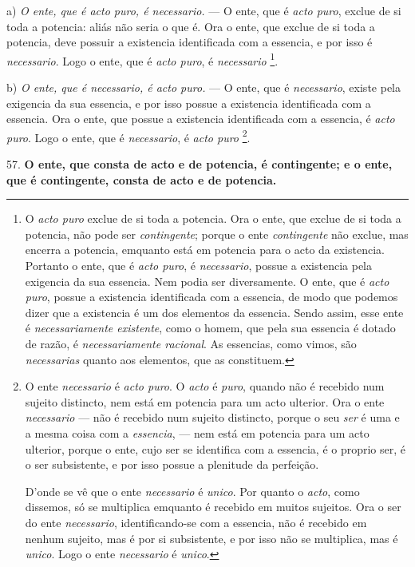 a) \emph{O ente, que é acto puro, é necessario.} --- O ente, que é \emph{acto puro}, exclue de si toda a potencia: aliás não seria o que é. Ora o ente, que exclue de si toda a potencia, deve possuir a existencia identificada com a essencia, e por isso é \emph{necessario}. Logo o ente, que é \emph{acto puro}, é \emph{necessario} \footnote{O \emph{acto puro} exclue de si toda a potencia. Ora o ente, que exclue de si toda a potencia, não pode ser \emph{contingente}; porque o ente \emph{contingente} não exclue, mas encerra a potencia, emquanto está em potencia para o acto da existencia. Portanto o ente, que é \emph{acto puro}, é \emph{necessario}, possue a existencia pela exigencia da sua essencia. Nem podia ser diversamente. O ente, que é \emph{acto puro}, possue a existencia identificada com a essencia, de modo que podemos dizer que a existencia é um dos elementos da essencia. Sendo assim, esse ente é \emph{necessariamente existente}, como o homem, que pela sua essencia é dotado de razão, é \emph{necessariamente racional}. As essencias, como vimos, são \emph{necessarias} quanto aos elementos, que as constituem.}.

b) \emph{O ente, que é necessario, é acto puro.} --- O ente, que é \emph{necessario}, existe pela exigencia da sua essencia, e por isso possue a existencia identificada com a essencia. Ora o ente, que possue a existencia identificada com a essencia, é \emph{acto puro}. Logo o ente, que é \emph{necessario}, é \emph{acto puro} \footnote{O ente \emph{necessario} é \emph{acto puro}. O \emph{acto} é \emph{puro}, quando não é recebido num sujeito distincto, nem está em potencia para um acto ulterior. Ora o ente \emph{necessario} --- não é recebido num sujeito distincto, porque o seu \emph{ser} é uma e a mesma coisa com a \emph{essencia}, --- nem está em potencia para um acto ulterior, porque o ente, cujo ser se identifica com a essencia, é o proprio ser, é o ser subsistente, e por isso possue a plenitude da perfeição.\par D'onde se vê que o ente \emph{necessario} é \emph{unico}. Por quanto o \emph{acto}, como dissemos, só se multiplica emquanto é recebido em muitos sujeitos. Ora o ser do ente \emph{necessario}, identificando-se com a essencia, não é recebido em nenhum sujeito, mas é por si subsistente, e por isso não se multiplica, mas é \emph{unico}. Logo o ente \emph{necessario} é \emph{unico}.}.

57. \textbf{O ente, que consta de acto e de potencia, é contingente; e o ente, que é contingente, consta de acto e de potencia.}

